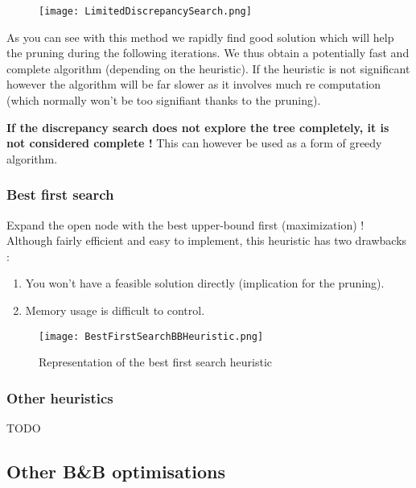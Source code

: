\begin{figure}[!ht]
    \centering
    \texttt{[image: LimitedDiscrepancySearch.png]}
    \label{fig:Knapsack_example}
\end{figure}
\FloatBarrier

As you can see with this method we rapidly find good solution which will help the pruning
during the following iterations. We thus obtain a potentially fast and complete algorithm
(depending on the heuristic). If the heuristic is not significant however the algorithm will
be far slower as it involves much re computation (which normally won't be too signifiant
thanks to the pruning).\newline

\textbf{If the discrepancy search does not explore the tree completely, 
it is not considered complete !} This can however be used as a form of greedy
algorithm.

\subsubsection{Best first search}

Expand the open node with the best upper-bound first (maximization) !
Although fairly efficient and easy to implement, this heuristic has two drawbacks :

\begin{enumerate}
	\item You won't have a feasible solution directly (implication for the pruning).
	\item Memory usage is difficult to control.
\end{enumerate}

\begin{figure}[!ht]
    \centering
    \texttt{[image: BestFirstSearchBBHeuristic.png]}
    \caption{Representation of the best first search heuristic}
    \label{fig:Knapsack_example}
\end{figure}
\FloatBarrier

\subsubsection{Other heuristics}

TODO

\subsection{Other B\&B optimisations}


